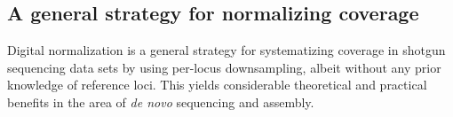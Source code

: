 




\subsection{A general strategy for normalizing coverage}

Digital normalization is a general strategy for systematizing coverage
in shotgun sequencing data sets by using per-locus downsampling,
albeit without any prior knowledge of reference loci.  This yields
considerable theoretical and practical benefits in the area of {\em de
  novo} sequencing and assembly.

